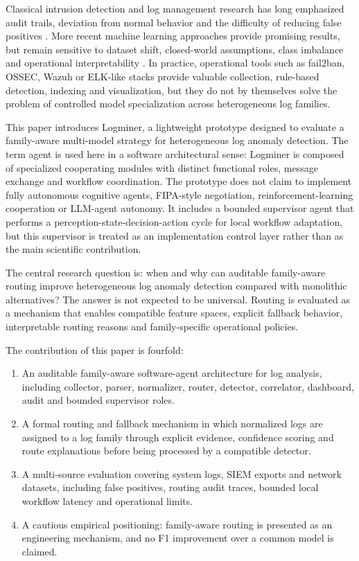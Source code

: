 \documentclass[conference]{IEEEtran}
\newcommand{\logminer}{Logminer}
\begin{document}
Classical intrusion detection and log management research has long emphasized audit trails, deviation from normal behavior and the difficulty of reducing false positives \cite{denning1987intrusion,axelsson2000intrusion,chandola2009anomaly}. More recent machine learning approaches provide promising results, but remain sensitive to dataset shift, closed-world assumptions, class imbalance and operational interpretability \cite{sommer2010outside,buczak2016survey,khraisat2019survey}. In practice, operational tools such as fail2ban, OSSEC, Wazuh or ELK-like stacks provide valuable collection, rule-based detection, indexing and visualization, but they do not by themselves solve the problem of controlled model specialization across heterogeneous log families.

This paper introduces \logminer, a lightweight prototype designed to evaluate a family-aware multi-model strategy for heterogeneous log anomaly detection. The term agent is used here in a software architectural sense: \logminer{} is composed of specialized cooperating modules with distinct functional roles, message exchange and workflow coordination. The prototype does not claim to implement fully autonomous cognitive agents, FIPA-style negotiation, reinforcement-learning cooperation or LLM-agent autonomy. It includes a bounded supervisor agent that performs a perception-state-decision-action cycle for local workflow adaptation, but this supervisor is treated as an implementation control layer rather than as the main scientific contribution.

The central research question is: when and why can auditable family-aware routing improve heterogeneous log anomaly detection compared with monolithic alternatives? The answer is not expected to be universal. Routing is evaluated as a mechanism that enables compatible feature spaces, explicit fallback behavior, interpretable routing reasons and family-specific operational policies.

The contribution of this paper is fourfold:
\begin{enumerate}
    \item An auditable family-aware software-agent architecture for log analysis, including collector, parser, normalizer, router, detector, correlator, dashboard, audit and bounded supervisor roles.
    \item A formal routing and fallback mechanism in which normalized logs are assigned to a log family through explicit evidence, confidence scoring and route explanations before being processed by a compatible detector.
    \item A multi-source evaluation covering system logs, SIEM exports and network datasets, including false positives, routing audit traces, bounded local workflow latency and operational limits.
    \item A cautious empirical positioning: family-aware routing is presented as an engineering mechanism, and no F1 improvement over a common model is claimed.
\end{enumerate}
\end{document}
